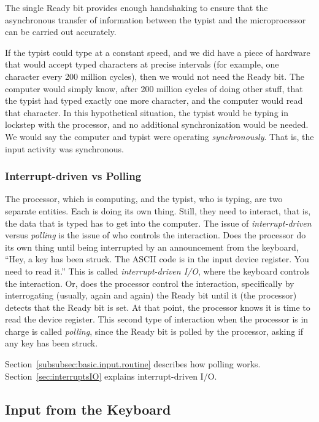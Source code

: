 \documentclass{patt}
\begin{document}
The single Ready bit provides enough handshaking to ensure that the
asynchronous transfer of information between the typist and the
microprocessor can be carried out accurately.

If the typist could type at a constant speed, and we did have a piece
of hardware that would accept typed characters at precise intervals
(for example, one character every 200 million cycles), then we would
not need the Ready bit.  The computer would simply know, after 200
million cycles of doing other stuff, that the typist had typed exactly
one more character, and the computer would read that character.  In
this hypothetical situation, the typist would be typing in lockstep
with the processor, and no additional synchronization would be needed.
We would say the computer and typist were operating {\em
  synchronously}.  That is, the input activity was synchronous.

\subsubsection{Interrupt-driven vs Polling}
\label{subsubsec:interruptVSpolling}

The processor, which is computing, and the typist, who is typing, are
two separate entities.  Each is doing its own thing.  Still, they need
to interact, that is, the data that is typed has to get into the
computer. The issue of {\em interrupt-driven} versus {\em polling} is
the issue of who controls the interaction.  Does the processor do its
own thing until being interrupted by an announcement from the
keyboard, ``Hey, a key has been struck. The ASCII code is in the input
device register.  You need to read it.'' This is called {\em
  interrupt-driven I/O}, where the keyboard controls the interaction.
Or, does the processor control the interaction, specifically by
interrogating (usually, again and again) the Ready bit until it (the
processor) detects that the Ready bit is set.  At that point, the
processor knows it is time to read the device register.  This second
type of interaction when the processor is in charge is called {\em polling}, 
since the Ready bit is polled by the processor, asking if any key has been 
struck.

Section~\ref{subsubsec:basic.input.routine} describes how polling
works. Section~\ref{sec:interruptsIO} explains interrupt-driven I/O.

\subsection{Input from the Keyboard}
\label{subsec:input.from.keyboard}
\end{document}
